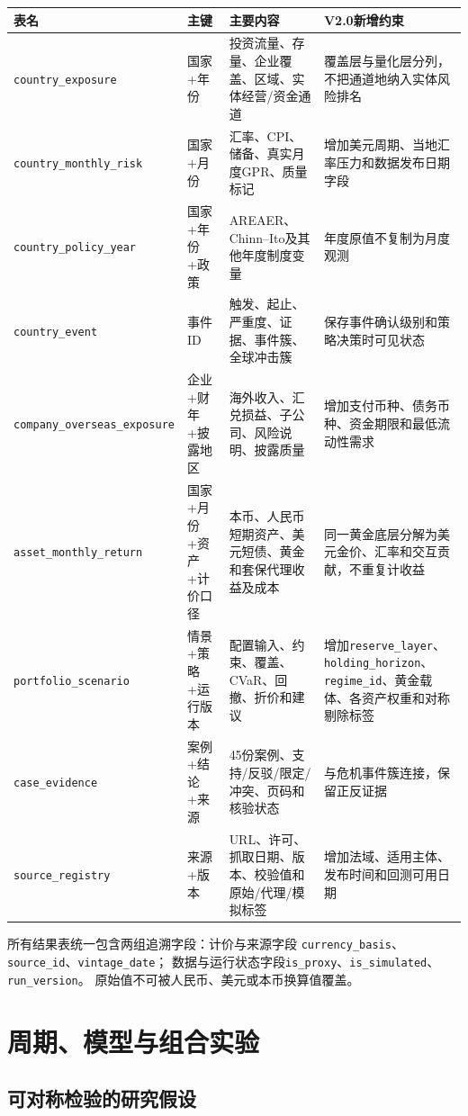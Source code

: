 \documentclass[UTF8,fontset=windows,12pt,openany]{ctexbook}
\newcommand{\Field}[1]{{\small\nolinkurl{#1}}}
\begin{document}
\small
\begin{longtable}{p{2.8cm}p{2.8cm}p{4.5cm}p{4.3cm}}
\toprule
\textbf{表名} & \textbf{主键} & \textbf{主要内容} & \textbf{V2.0新增约束}\\
\midrule
\Field{country_exposure} & 国家+年份 & 投资流量、存量、企业覆盖、区域、实体经营/资金通道 & 覆盖层与量化层分列，不把通道地纳入实体风险排名\\
\Field{country_monthly_risk} & 国家+月份 & 汇率、CPI、储备、真实月度GPR、质量标记 & 增加美元周期、当地汇率压力和数据发布日期字段\\
\Field{country_policy_year} & 国家+年份+政策 & AREAER、Chinn--Ito及其他年度制度变量 & 年度原值不复制为月度观测\\
\Field{country_event} & 事件ID & 触发、起止、严重度、证据、事件簇、全球冲击簇 & 保存事件确认级别和策略决策时可见状态\\
\Field{company_overseas_exposure} & 企业+财年+披露地区 & 海外收入、汇兑损益、子公司、风险说明、披露质量 & 增加支付币种、债务币种、资金期限和最低流动性需求\\
\Field{asset_monthly_return} & 国家+月份+资产+计价口径 & 本币、人民币短期资产、美元短债、黄金和套保代理收益及成本 & 同一黄金底层分解为美元金价、汇率和交互贡献，不重复计收益\\
\Field{portfolio_scenario} & 情景+策略+运行版本 & 配置输入、约束、覆盖、CVaR、回撤、折价和建议 & 增加\Field{reserve_layer}、\Field{holding_horizon}、\Field{regime_id}、黄金载体、各资产权重和对称剔除标签\\
\Field{case_evidence} & 案例+结论+来源 & 45份案例、支持/反驳/限定/冲突、页码和核验状态 & 与危机事件簇连接，保留正反证据\\
\Field{source_registry} & 来源+版本 & URL、许可、抓取日期、版本、校验值和原始/代理/模拟标签 & 增加法域、适用主体、发布时间和回测可用日期\\
\bottomrule
\end{longtable}
\normalsize

所有结果表统一包含两组追溯字段：计价与来源字段
\Field{currency_basis}、\Field{source_id}、\Field{vintage_date}；
数据与运行状态字段\Field{is_proxy}、\Field{is_simulated}、\Field{run_version}。
原始值不可被人民币、美元或本币换算值覆盖。

\part{周期、模型与组合实验}

\chapter{可对称检验的研究假设}
\end{document}

